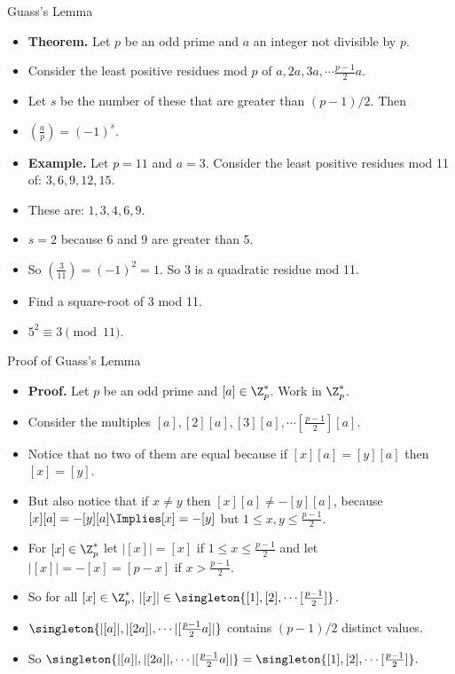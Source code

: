 \documentclass[handout]{beamer}
\begin{document}
\begin{frame}{Guass's Lemma}

\begin{itemize}
  \item \textbf{Theorem.}  Let $p$ be an odd prime and $a$ an integer not divisible by $p$.
  \item Consider the least positive residues mod $p$ of $a, 2a, 3a, \cdots \frac{p-1}{2} a$.
  \item Let $s$ be the number of these that are greater than $(p-1)/2$. Then
  \item $(\frac{a}{p}) = (-1)^s$.
  \item \textbf{Example.} Let $p=11$ and $a=3$. Consider the least positive residues mod 11 of:
  $3, 6, 9, 12, 15$.
  \item These are: $1, 3, 4, 6, 9$.
  \item $s=2$ because 6 and 9 are greater than 5.
  \item So  $(\frac{3}{11}) = (-1)^2 = 1$. So 3 is a quadratic residue mod 11.
  \item Find a square-root of 3 mod 11.
  \item $5^2 \equiv 3 \pmod {11}$.
\end{itemize}

\end{frame}

\begin{frame}{Proof of Guass's Lemma}

\begin{itemize}
  \item \textbf{Proof.} Let $p$ be an odd prime and $[a]\in\Z^*_p$. Work in $\Z^*_p$.
  \item Consider the multiples $[a],[2][a],[3][a],\cdots[\frac{p-1}{2}][a]$.
  \item Notice that no two of them are equal because if $[x][a]=[y][a]$ then $[x]=[y]$.
  \item But also notice that if $x\not=y$ then $[x][a] \not= -[y][a]$, because
  $[x][a] = -[y][a] \Implies [x]=-[y]$ but $1\leq x,y\leq \frac{p-1}{2}$.
  \item For $[x]\in \Z^*_p$ let $|[x]| = [x]$ if $1\leq x \leq \frac{p-1}{2}$ and
  let $|[x]| = -[x] = [p-x]$ if $x>\frac{p-1}{2}$.
  \item So for all $[x]\in\Z^*_p$, $|[x]|\in \singleton{[1],[2],\cdots [\frac{p-1}{2}]}$.
  \item $\singleton{|[a]|,|[2a]|,\cdots |[\frac{p-1}{2}a]|}$ contains $(p-1)/2$ distinct values.
  \item So $\singleton{|[a]|,|[2a]|,\cdots |[\frac{p-1}{2}a]|} = \singleton{[1],[2],\cdots [\frac{p-1}{2}]}.$
\end{itemize}

\end{frame}
\end{document}

